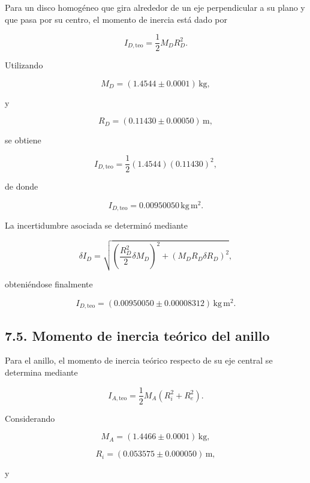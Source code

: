 \documentclass[11pt,a4paper]{article}
\begin{document}
Para un disco homogéneo que gira alrededor de un eje perpendicular a su
plano y que pasa por su centro, el momento de inercia está dado por

\begin{equation}
I_{D,\mathrm{teo}}
=
\frac{1}{2}M_D R_D^2.
\label{eq:I_disco_teorico}
\end{equation}

Utilizando

\[
M_D=(1.4544\pm0.0001)\,\mathrm{kg},
\]

y

\[
R_D=(0.11430\pm0.00050)\,\mathrm{m},
\]

se obtiene

\[
I_{D,\mathrm{teo}}
=
\frac{1}{2}(1.4544)(0.11430)^2,
\]

de donde

\[
I_{D,\mathrm{teo}}
=
0.00950050\,\mathrm{kg\,m^2}.
\]

La incertidumbre asociada se determinó mediante

\[
\delta I_D=
\sqrt{
\left(
\frac{R_D^2}{2}\delta M_D
\right)^2
+
\left(
M_D R_D\delta R_D
\right)^2
},
\]

obteniéndose finalmente

\begin{equation}
I_{D,\mathrm{teo}}
=
(0.00950050\pm0.00008312)\,\mathrm{kg\,m^2}.
\label{eq:I_disco_teorico_final}
\end{equation}



\subsection*{7.5. Momento de inercia teórico del anillo}

Para el anillo, el momento de inercia teórico respecto de su eje central
se determina mediante

\begin{equation}
I_{A,\mathrm{teo}}
=
\frac{1}{2}M_A
\left(
R_i^2+R_e^2
\right).
\label{eq:I_anillo_teorico}
\end{equation}

Considerando

\[
M_A=(1.4466\pm0.0001)\,\mathrm{kg},
\]

\[
R_i=(0.053575\pm0.000050)\,\mathrm{m},
\]

y
\end{document}
